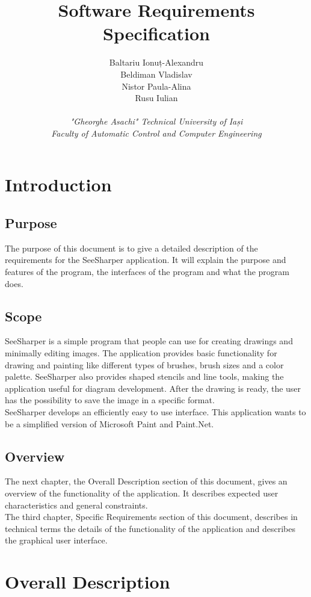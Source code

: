 \documentclass{article}
\title{\textbf{Software Requirements Specification}}
\author
{
	Baltariu Ionuț-Alexandru
	\\
	Beldiman Vladislav
	\\
	Nistor Paula-Alina 
	\\
	Rusu Iulian
	\\
	\\
	\textit{"Gheorghe Asachi" Technical University of Iași}
	\\
	\textit{Faculty of Automatic Control and Computer Engineering}
}
\date{}
\begin{document}
\maketitle 

\newpage
\tableofcontents
\newpage

\section{Introduction}
\subsection{Purpose}
The purpose of this document is to give a detailed description of the requirements for the SeeSharper application.
It will explain the purpose and features of the program, the interfaces of the program and what the program does.

\subsection{Scope}
SeeSharper is a simple program that people can use for creating drawings and minimally editing images. The application provides basic functionality for drawing and painting like different types of brushes, brush sizes and a color palette. 
SeeSharper also provides shaped stencils and line tools, making the application useful for diagram development. After the drawing is ready, the user has the possibility to save the image in a specific format.
\\
SeeSharper develops an efficiently easy to use interface. This application wants to be a simplified version of Microsoft Paint and Paint.Net.

\subsection{Overview}
The next chapter, the Overall Description section of this document, gives an overview of the functionality of the application. It describes expected user characteristics and general constraints.
\\
The third chapter, Specific Requirements section of this document, describes in technical terms the details of the functionality of the application and describes the graphical  user  interface.	

\section{Overall Description}
\end{document}
